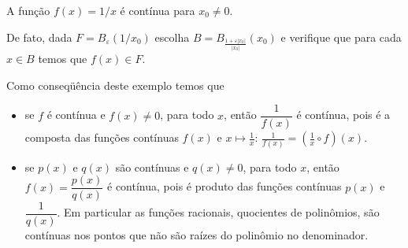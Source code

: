 \documentclass[11pt, oneside, a4paper]{gsm-l}
\begin{document}
\begin{exem}
  A função $f(x)=1\slash x$ é contínua para $x_0\ne 0$.

  De fato, dada $F=B_\varepsilon(1\slash x_0)$ escolha
  $B=B_{\frac{1+\varepsilon|x_0|}{|x_0|}}(x_0)$ e verifique que para
  cada $x\in B$ temos que $f(x)\in F$.
\end{exem}

\begin{obs}
  Como conseqüência deste exemplo temos que 
  \begin{itemize}
    \item se $f$ é contínua e $f(x)\ne 0$, para todo $x$, então
    $\dfrac{1}{f(x)}$ é contínua, pois é a composta das funções
    contínuas $f(x)$ e $x\mapsto \frac{1}{x}$:
    $\frac{1}{f(x)}=\left(\frac{1}{x}\circ f\right)(x)$.
    \item se $p(x)$ e $q(x)$ são contínuas e $q(x)\ne 0$, para todo $x$,
    então $f(x)=\dfrac{p(x)}{q(x)}$ é contínua, pois é produto das
    funções contínuas $p(x)$ e $\dfrac{1}{q(x)}$. Em particular as
    funções racionais, quocientes de polinômios, são contínuas nos
    pontos que não são raízes do polinômio no denominador.
  \end{itemize}
\end{obs}








\end{document}

